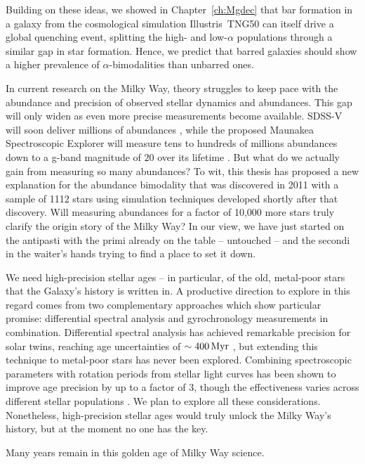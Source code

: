 Building on these ideas, we showed in Chapter~\ref{ch:Mgdec} that bar formation in a galaxy from the cosmological simulation Illustris~TNG50 can itself drive a global quenching event, splitting the high- and low-$\alpha$ populations through a similar gap in star formation. Hence, we predict that barred galaxies should show a higher prevalence of $\alpha$-bimodalities than unbarred ones.

In current research on the Milky Way, theory struggles to keep pace with the abundance and precision of observed stellar dynamics and abundances. This gap will only widen as even more precise measurements become available. SDSS-V will soon deliver millions of abundances \citep{2017AJ....154...94M}, while the proposed Maunakea Spectroscopic Explorer will measure tens to hundreds of millions abundances down to a g-band magnitude of $20$ over its lifetime \citep{2023AN....34430108S}. But what do we actually gain from measuring so many abundances? To wit, this thesis has proposed a new explanation for the abundance bimodality that was discovered in 2011 with a sample of 1112 stars \citep{2011A&A...535L..11A} using simulation techniques developed shortly after that discovery. Will measuring abundances for a factor of 10,000 more stars truly clarify the origin story of the Milky Way? In our view, we have just started on the antipasti with the primi already on the table -- untouched -- and the secondi in the waiter's hands trying to find a place to set it down.

We need high-precision stellar ages -- in particular, of the old, metal-poor stars that the Galaxy's history is written in. A productive direction to explore in this regard comes from two complementary approaches which show particular promise: differential spectral analysis and gyrochronology measurements in combination. Differential spectral analysis has achieved remarkable precision for solar twins, reaching age uncertainties of $\sim400\,\textrm{Myr}$ \citep{2018MNRAS.474.2580S}, but extending this technique to metal-poor stars has never been explored. Combining spectroscopic parameters with rotation periods from stellar light curves has been shown to improve age precision by up to a factor of 3, though the effectiveness varies across different stellar populations \citep{2019AJ....158..173A}. We plan to explore all these considerations. Nonetheless, high-precision stellar ages would truly unlock the Milky Way's history, but at the moment no one has the key.

Many years remain in this golden age of Milky Way science.
